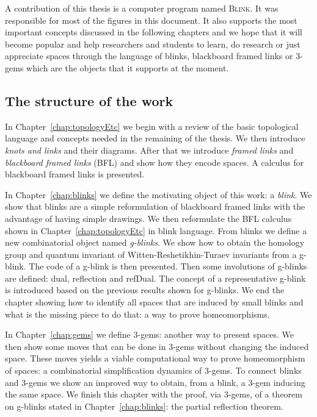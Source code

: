 A contribution of this thesis is a computer program named \textsc{Blink}.
It was responsible for most of the figures in this document. It also
supports the most important concepts discussed in the following
chapters and we hope that it will become popular and help researchers and
students to learn, do research or just appreciate spaces through
the language of blinks, blackboard framed links or 3-gems which are
the objects that it supports at the moment.

\subsection{The structure of the work}

In Chapter~\ref{chap:topologyEtc} we begin with a
review of the basic topological language and concepts needed in the remaining of
the thesis. We then introduce {\it knots and links} and their diagrams.
After that we introduce {\it framed links} and
{\it blackboard framed links} (BFL) and show how they encode spaces.
A calculus for blackboard framed links is presented.

In Chapter~\ref{chap:blinks} we define the motivating object of this
work: a {\it blink}. We show that blinks are a simple
reformulation of blackboard framed links with the advantage of having
simple drawings. We then reformulate the BFL calculus shown in
Chapter~\ref{chap:topologyEtc} in blink language. From
blinks we define a new combinatorial object named {\it g-blinks}. We show
how to obtain the homology group and quantum invariant of
Witten-Reshetikhin-Turaev invariants from a g-blink. The code
of a g-blink is then presented. Then some involutions
of g-blinks are defined: dual, reflection and refDual. The concept
of a representative g-blink is introduced based on the previous
results shown for g-blinks. We end the chapter showing how to
identify all spaces that are induced by small blinks and what
is the missing piece to do that: a way to prove homeomorphisms.

In Chapter~\ref{chap:gems} we define 3-gems: another way to present
spaces. We then show some moves that can be done in
3-gems without changing the induced space. These moves yields a
viable computational way to prove homeomorphism of spaces: a
combinatorial simplification dynamics of 3-gems. To connect blinks
and 3-gems we show an improved way to obtain, from a blink,
a 3-gem inducing the same space. We finish this chapter with the
proof, via 3-gems, of a theorem on g-blinks stated in
Chapter~\ref{chap:blinks}: the partial reflection theorem.

